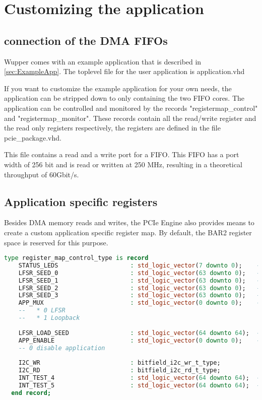 \section{Customizing the application}
\subsection{connection of the DMA FIFOs}
Wupper comes with an example application that is described in \ref{sec:ExampleApp}. The toplevel file for the user application is application.vhd

If you want to customize the example application for your own needs, the application can be stripped down to only containing the two FIFO cores. The application can be controlled and monitored by the records "registermap\_control" and "registermap\_monitor". These records contain all the read/write register and the read only registers respectively, the registers are defined in the file pcie\_package.vhd.

This file contains a read and a write port for a FIFO. This FIFO has a port width of 256 bit and is read or written at 250 MHz, resulting in a theoretical throughput of 60Gbit/s.

\subsection{Application specific registers}
Besides DMA memory reads and writes, the PCIe Engine also provides means to create a custom application specific register map. By default, the BAR2 register space is reserved for this purpose.

\begin{lstlisting}[language=VHDL, frame=single, caption=custom register types]
  type register_map_control_type is record
	STATUS_LEDS                    : std_logic_vector(7 downto 0);    -- Board GPIO Leds
	LFSR_SEED_0                    : std_logic_vector(63 downto 0);   -- Least significant 64 bits of the LFSR seed
	LFSR_SEED_1                    : std_logic_vector(63 downto 0);   -- Bits 127 downto 64 of the LFSR seed
	LFSR_SEED_2                    : std_logic_vector(63 downto 0);   -- Bits 191 downto 128 of the LFSR seed
	LFSR_SEED_3                    : std_logic_vector(63 downto 0);   -- Bits 255 downto 192 of the LFSR seed
	APP_MUX                        : std_logic_vector(0 downto 0);    -- Switch between multiplier or LFSR.
	--   * 0 LFSR
	--   * 1 Loopback
	
	LFSR_LOAD_SEED                 : std_logic_vector(64 downto 64);  -- Writing any value to this register triggers the LFSR module to reset to the LFSR_SEED value
	APP_ENABLE                     : std_logic_vector(0 downto 0);    -- 1 Enables LFSR module or Loopback (depending on APP_MUX)
	-- 0 disable application
	
	I2C_WR                         : bitfield_i2c_wr_t_type;       
	I2C_RD                         : bitfield_i2c_rd_t_type;       
	INT_TEST_4                     : std_logic_vector(64 downto 64);  -- Fire a test MSIx interrupt #4
	INT_TEST_5                     : std_logic_vector(64 downto 64);  -- Fire a test MSIx interrupt #5
  end record;

\end{lstlisting}


